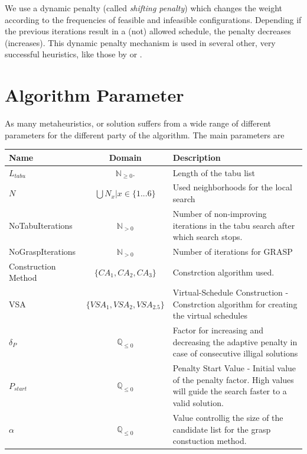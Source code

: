 \documentclass[a4paper,11pt]{article}
\begin{document}
We use a dynamic penalty (called \emph{shifting penalty}) which changes the weight according to the frequencies of feasible and infeasible configurations.
 Depending if the previous iterations result in a (not) allowed schedule, the penalty decreases (increases). 
This dynamic penalty mechanism is used in several other, very successful heuristics, like those by \cite{Anagnostopoulos06} or \cite{Gaspero07}.


\section{Algorithm Parameter}
As many metaheuristics, or solution suffers from a wide range of different parameters for the different party of the algorithm.
The main parameters are
\begin{center}
\begin{tabularx}{\linewidth}{| X | c | X | }
  \hline                       
  Name & Domain & Description \\   \hline     \hline    
  $L_{tabu}$ & $\mathbb{N}_{\geq0}.$ & Length of the tabu list \\ \hline    
  $N$ & $\bigcup N_x  | x \in \{1...6\}$ & Used neighborhoods for the local search \\ \hline   
  NoTabuIterations &  $\mathbb{N}_{ > 0}$ & Number of non-improving iterations in the tabu search after which search stops. \\ \hline  
  NoGraspIterations &  $\mathbb{N}_{> 0}$ & Number of iterations for \ac{GRASP} \\ \hline 
  Construction Method &  $\{CA_1, CA_2, CA_3\}$ & Constrction algorithm used.\\ \hline 
  VSA &  $\{VSA_1, VSA_2, VSA_{2.5}\}$ & Virtual-Schedule Construction - Constrction algorithm for creating the virtual schedules\\ \hline 
  $ \delta_P $ &  $\mathbb{Q}_{\leq0}$ & Factor for increasing and decreasing the adaptive penalty in case of consecutive illigal solutions\\ \hline 
  $P_{start}$ &  $\mathbb{Q}_{\leq0}$ &Penalty Start Value -  Initial value of the penalty factor. High values will guide the search faster to a valid solution.\\ \hline    
  $\alpha$ & $\mathbb{Q}_{\leq0}$ & Value controllig the size of the candidate list for the grasp constuction method. \\ \hline    
  \hline  
\end{tabularx}
\end{center}
\end{document}

